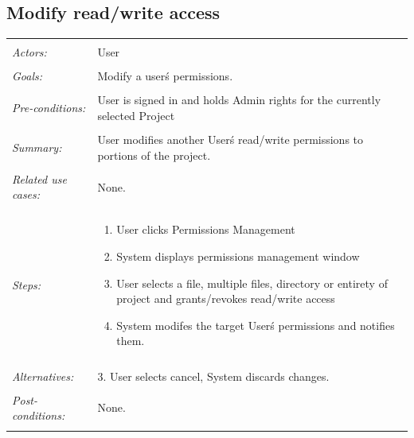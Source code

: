 \documentclass[11pt]{report}
\begin{document}
\subsection{Modify read/write access}
\begin{tabular}{ p{2cm} p{12cm} }
 \hline
 \\
 \textit{Actors:} & User \\ 
 \\
 \textit{Goals:} & Modify a user\'s permissions. \\
 \\
 \textit{Pre-conditions:} & User is signed in and holds Admin rights for the currently selected Project\\
 \\
 \textit{Summary:} & User modifies another User\'s read/write permissions to portions of the project. \\
 \\
 \textit{Related use cases:} & None. \\ 
 \\
 \textit{Steps:} & \begin{enumerate}
  \item User clicks Permissions Management
  \item System displays permissions management window
  \item User selects a file, multiple files, directory or entirety of project and grants/revokes read/write access
  \item System modifes the target User\'s permissions and notifies them.
 \end{enumerate} \\
 \\
 \textit{Alternatives:} & 3. User selects cancel, System discards changes. \\
 \\
 \textit{Post-conditions:} & None. \\
 \\
\hline
\end{tabular}
\end{document}
